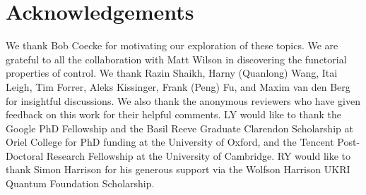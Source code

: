 \section{Acknowledgements}
We thank Bob Coecke for motivating our exploration of these topics. We are grateful to all the collaboration with Matt Wilson in discovering the functorial properties of control. We thank Razin Shaikh, Harny (Quanlong) Wang, Itai Leigh, Tim Forrer, Aleks Kissinger, Frank (Peng) Fu, and Maxim van den Berg for insightful discussions. We also thank the anonymous reviewers who have given feedback on this work for their helpful comments.
LY would like to thank the Google PhD Fellowship and the Basil Reeve Graduate Clarendon Scholarship at Oriel College for PhD funding at the University of Oxford, and the Tencent Post-Doctoral Research Fellowship at the University of Cambridge.
RY would like to thank Simon Harrison for his generous support via the Wolfson Harrison UKRI Quantum Foundation Scholarship.
